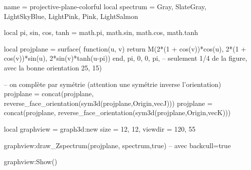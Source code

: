 \documentclass{standalone}
\begin{document}
\begin{luadraw}{name = projective-plane-colorful}
local spectrum = {Gray, SlateGray, LightSkyBlue, LightPink, Pink, LightSalmon}

local pi, sin, cos, tanh = math.pi, math.sin, math.cos, math.tanh

local projplane = surface(
  function(u, v)
    return M(2*(1 + cos(v))*cos(u), 2*(1 + cos(v))*sin(u), 2*sin(v)*tanh(u-pi))
  end,
  pi, 0, 0, pi, -- seulement 1/4 de la figure, avec la bonne orientation
  {25, 15})

-- on complète par symétrie (attention une symétrie inverse l'orientation)
projplane = concat(projplane, reverse_face_orientation(sym3d(projplane,{Origin,vecJ})))
projplane = concat(projplane, reverse_face_orientation(sym3d(projplane,{Origin,vecK})))

local graphview = graph3d:new{
  size    = {12, 12},
  viewdir = {120, 55}
}

graphview:draw_Zspectrum(projplane, spectrum,true) -- avec backcull=true

graphview:Show()
\end{luadraw}
\end{document}
